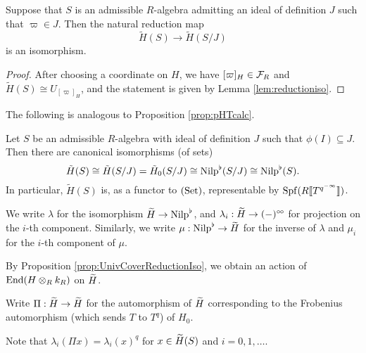 \documentclass[../main.tex]{subfiles}
\begin{document}
\begin{lem}
  Suppose that $S$ is an admissible $R$-algebra admitting an ideal of definition
  $J$ such that $\varpi \in J$. Then the natural reduction map
  \begin{equation*}
    \tilde H(S) \to \tilde H(S/J)
  \end{equation*}
  is an isomorphism.
  \begin{proof}[Proof]
    After choosing a coordinate on $H$, we have $[\varpi]_H \in \cF_R$ and 
    $\tilde H(S) \cong U_{[\varpi]_H}$, and the statement is given by 
    Lemma \ref{lem:reductioniso}.
  \end{proof}
\end{lem}

The following is analogous to Proposition \ref{prop:pHTcalc}.
\begin{prop}\label{prop:UnivCoverReductionIso}
  Let $S$ be an admissible $R$-algebra with ideal of definition $J$ such that 
  $\phi(I) \subseteq J$. Then there are canonical isomorphisms (of sets)
  \begin{equation*}
    \tilde H(S) \cong \tilde H(S/J) = \tilde H_0(S/J) \cong \Nilp^\flat(S/J) \cong
    \Nilp^\flat(S).
  \end{equation*}
  In particular, $\tilde H(S)$ is, as a functor to $\Set$, representable by
  $\spf(R \llbr T^{q^{-\infty}} \rrbr)$.
\end{prop}
We write $\lambda$ for the isomorphism $\Tilde H \to \Nilp^\flat$, and
$\lambda_i: \Tilde H \to (-)^\cici$ for projection on the $i$-th component.
Similarly, we write $\mu: \Nilp^\flat \to \Tilde H$ for the inverse of 
$\lambda$ and $\mu_i$ for the $i$-th component of $\mu$. 

By Proposition \ref{prop:UnivCoverReductionIso}, we obtain an action of 
$\End(H \otimes_R k_R)$ on $\Tilde H$.

\begin{defi} \label{def:FrobOnUnivCov}
  Write $\Pi: \Tilde H \to \Tilde H$ for the automorphism of $\Tilde H$ corresponding
  to the Frobenius automorphism (which sends $T$ to $T^q$) of $H_0$.
\end{defi}

Note that $\lambda_i(\Pi x) = \lambda_i(x)^q$ for $x \in \Tilde H(S)$ and 
$i=0,1,\dots$. 
\end{document}
